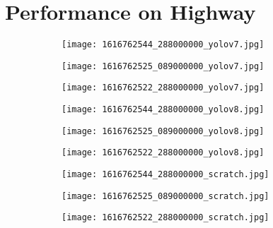 \section{Performance on Highway} \label{sec:ablation_study_highway}

\begin{table}[htb]%
	\centering
	\small
	\setlength\tabcolsep{4pt}
	
	\begin{subfigure}{\textwidth}
		\centering
		\begin{subfigure}{0.32\textwidth}
			\texttt{[image: 1616762544\_288000000\_yolov7.jpg]}
		\end{subfigure}\hfill
		\begin{subfigure}{0.32\textwidth}
			\texttt{[image: 1616762525\_089000000\_yolov7.jpg]}
		\end{subfigure}\hfill
		\begin{subfigure}{0.32\textwidth}
			\texttt{[image: 1616762522\_288000000\_yolov7.jpg]}
		\end{subfigure}
	\end{subfigure}
	
	\begin{subfigure}{\textwidth}
		\centering
		\begin{subfigure}{0.32\textwidth}
			\texttt{[image: 1616762544\_288000000\_yolov8.jpg]}
		\end{subfigure}\hfill
		\begin{subfigure}{0.32\textwidth}
			\texttt{[image: 1616762525\_089000000\_yolov8.jpg]}
		\end{subfigure}\hfill
		\begin{subfigure}{0.32\textwidth}
			\texttt{[image: 1616762522\_288000000\_yolov8.jpg]}
		\end{subfigure}
	\end{subfigure}
	
	\begin{subfigure}{\textwidth}
		\centering
		\begin{subfigure}{0.32\textwidth}
			\texttt{[image: 1616762544\_288000000\_scratch.jpg]}
		\end{subfigure}\hfill
		\begin{subfigure}{0.32\textwidth}
			\texttt{[image: 1616762525\_089000000\_scratch.jpg]}
		\end{subfigure}\hfill
		\begin{subfigure}{0.32\textwidth}
			\texttt{[image: 1616762522\_288000000\_scratch.jpg]}
		\end{subfigure}
	\end{subfigure}
	

\end{table}
